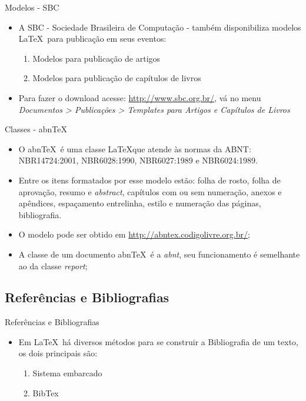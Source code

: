 \begin{frame}{Modelos - SBC}
    
    \begin{itemize}
    \item A SBC - Sociedade Brasileira de Computação - também disponibiliza modelos \LaTeX\ para publicação em seus eventos:
        \begin{enumerate}
        \item Modelos para publicação de artigos
        \item Modelos para publicação de capítulos de livros
        \end{enumerate}
    \item Para fazer o download acesse: \url{http://www.sbc.org.br/}, vá no menu \textit{Documentos > Publicações > Templates para Artigos e Capítulos de Livros}
    \end{itemize}

\end{frame}

\begin{frame}{Classes - abn\TeX}

    \begin{itemize}
    \item O abn\TeX\ é uma classe \LaTeX que atende às normas da ABNT: NBR14724:2001, NBR6028:1990, NBR6027:1989 e NBR6024:1989.
    \item Entre os itens formatados por esse modelo estão: folha de rosto, folha de aprovação, resumo e \textit{abstract}, capítulos com ou sem numeração, anexos e apêndices, espaçamento entrelinha, estilo e numeração das páginas, bibliografia.
    \item O modelo pode ser obtido em \url{http://abntex.codigolivre.org.br/};
    \item A classe de um documento abn\TeX\ é a \textit{abnt}, seu funcionamento é semelhante ao da classe \textit{report};
    \end{itemize}

\end{frame}


\subsection{Referências e Bibliografias}
\begin{frame}{Referências e Bibliografias}

  \begin{itemize}
    \item Em \LaTeX\ há diversos métodos para se construir a Bibliografia de um texto, os dois principais são:
 
    \begin{enumerate}
        \item Sistema embarcado
        \item BibTex
    \end{enumerate}
  \end{itemize}

\end{frame}

